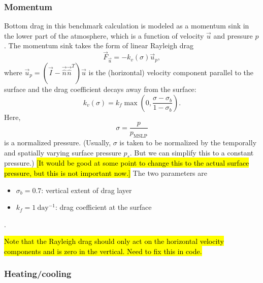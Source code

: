 \documentclass{report}
\begin{document}
\subsubsection{Momentum} 

Bottom drag in this benchmark calculation is modeled as a momentum sink in the lower part of the atmosphere, which is a function of velocity $\vec{u}$ and pressure $p$. The momentum sink takes the form of linear Rayleigh drag
\begin{equation}
    \vec{F}_{\vec{u}} = -k_v(\sigma) \vec{u}_p,
\end{equation}
where $\vec{u}_p = (\vec{I} - \vec{\hat n}\vec{\hat n}^T)\vec{u}$ is the (horizontal) velocity component parallel to the surface and the drag coefficient decays away from the surface:
\begin{equation}
    k_v(\sigma) = k_f \max \left( 0, \frac{\sigma - \sigma_b}{1-\sigma_b} \right).
\end{equation}
Here,
\[
\sigma = \frac{p}{p_{\mathrm{MSLP}}}
\]
is a normalized pressure. (Usually, $\sigma$ is taken to be normalized by the temporally and spatially varying surface pressure $p_s$. But we can simplify this to a constant pressure.) \hl{[It would be good at some point to change this to the actual surface pressure, but this is not important now.]} The two parameters are
\begin{itemize}
    \item $\sigma_b = 0.7$: vertical extent of drag layer
    \item $k_f = 1~\mathrm{day^{-1}}$: drag coefficient at the surface
\end{itemize}.

\hl{Note that the Rayleigh drag should only act on the horizontal velocity components and is zero in the vertical. Need to fix this in code.}

\subsubsection{Heating/cooling}
\end{document}
